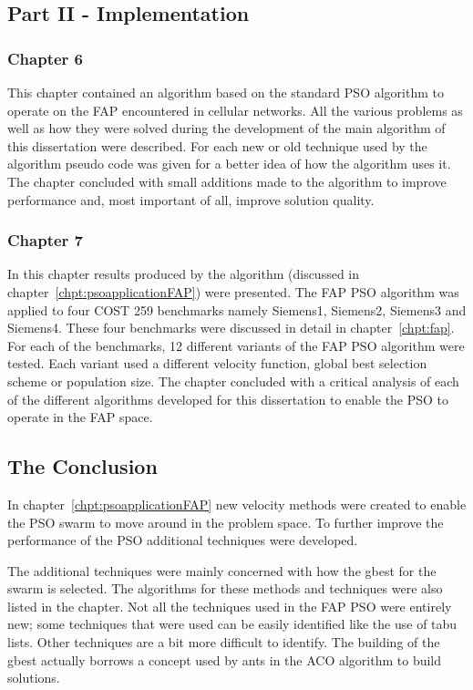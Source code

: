\subsection{Part II - Implementation}
\subsubsection{Chapter 6}
This chapter contained an algorithm based on the standard PSO algorithm to operate on the FAP encountered in cellular networks.
All the various problems as well as how they were solved during the development of the main algorithm of this dissertation were described. For each new or old technique used by the algorithm pseudo code was given for a better idea of how the algorithm uses it.
The chapter concluded with small additions made to the algorithm to improve performance and, most important of all, improve solution quality.
\subsubsection{Chapter 7}
In this chapter results produced by the algorithm (discussed in chapter~\ref{chpt:psoapplicationFAP}) were presented. The FAP PSO algorithm was applied to four COST 259 benchmarks namely Siemens1, Siemens2, Siemens3 and Siemens4. These four benchmarks were discussed in detail in chapter~\ref{chpt:fap}. For each of the benchmarks, 12 different variants of the FAP PSO algorithm were tested. Each variant used a different velocity function, global best selection scheme or population size. The chapter concluded with a critical analysis of each of the different algorithms developed for this dissertation to enable the PSO to operate in the FAP space.
\subsection{The Conclusion}
In chapter~\ref{chpt:psoapplicationFAP} new velocity methods were created to enable the PSO swarm to move around in the problem space. To further improve the performance of the PSO additional techniques were developed.

The additional techniques were mainly concerned with how the gbest for the swarm is selected. The algorithms for these methods and techniques were also listed in the chapter. Not all the techniques used in the FAP PSO were entirely new; some techniques that were used can be easily identified like the use of tabu lists. Other techniques are a bit more difficult to identify. The building of the gbest actually borrows a concept used by ants in the ACO algorithm to build solutions. 

